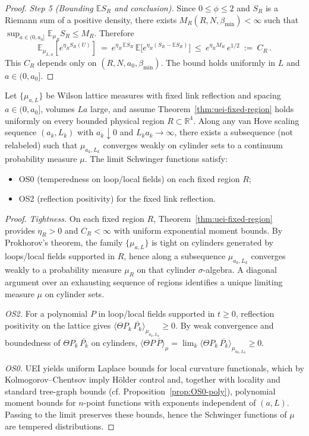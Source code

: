 \documentclass[11pt]{amsart}
\begin{document}
\begin{proof}
\emph{Step 5 (Bounding $\mathbb{E}S_R$ and conclusion).} Since $0\le\phi\le 2$ and $S_R$ is a Riemann sum of a positive density, there exists $M_R(R,N,\beta_{\min})<\infty$ such that $\sup_{a\in(0,a_0]}\mathbb{E}_{\mu_R}S_R\le M_R$. Therefore
\[
  \mathbb{E}_{\mu_{L,a}}\!\left[e^{\eta_R S_R(U)}\right]
  \ =\ e^{\eta_R\,\mathbb{E}S_R}\,\mathbb{E}\big[e^{\eta_R(S_R-\mathbb{E}S_R)}\big]
  \ \le\ e^{\eta_R M_R}\,e^{1/2}
  \ :=\ C_R\,.
\]
This $C_R$ depends only on $(R,N,a_0,\beta_{\min})$. The bound holds uniformly in $L$ and $a\in(0,a_0]$.
\end{proof}

\medskip
\begin{proposition}\label{prop:os0os2-closure}
Let $\{\mu_{a,L}\}$ be Wilson lattice measures with fixed link reflection and spacing $a\in(0,a_0]$, volumes $L a$ large, and assume Theorem~\ref{thm:uei-fixed-region} holds uniformly on every bounded physical region $R\subset\mathbb R^4$. Along any van Hove scaling sequence $(a_k,L_k)$ with $a_k\downarrow 0$ and $L_k a_k\to\infty$, there exists a subsequence (not relabeled) such that $\mu_{a_k,L_k}$ converges weakly on cylinder sets to a continuum probability measure $\mu$. The limit Schwinger functions satisfy:
\begin{itemize}
  \item OS0 (temperedness on loop/local fields) on each fixed region $R$;
  \item OS2 (reflection positivity) for the fixed link reflection.
\end{itemize}
\end{proposition}
\begin{proof}
\emph{Tightness.} On each fixed region $R$, Theorem~\ref{thm:uei-fixed-region} provides $\eta_R>0$ and $C_R<\infty$ with uniform exponential moment bounds. By Prokhorov's theorem, the family $\{\mu_{a,L}\}$ is tight on cylinders generated by loops/local fields supported in $R$, hence along a subsequence $\mu_{a_k,L_k}$ converges weakly to a probability measure $\mu_R$ on that cylinder $\sigma$-algebra. A diagonal argument over an exhausting sequence of regions identifies a unique limiting measure $\mu$ on cylinder sets.

\emph{OS2.} For a polynomial $P$ in loop/local fields supported in $t\ge 0$, reflection positivity on the lattice gives $\langle \Theta P_k\,\overline{P_k}\rangle_{\mu_{a_k,L_k}}\ge 0$. By weak convergence and boundedness of $\Theta P_k\,\overline{P_k}$ on cylinders, $\langle \Theta P\,\overline{P}\rangle_{\mu}=\lim_k \langle \Theta P_k\,\overline{P_k}\rangle_{\mu_{a_k,L_k}}\ge 0$.

\emph{OS0.} UEI yields uniform Laplace bounds for local curvature functionals, which by Kolmogorov--Chentsov imply Hölder control and, together with locality and standard tree-graph bounds (cf. Proposition~\ref{prop:OS0-poly}), polynomial moment bounds for $n$-point functions with exponents independent of $(a,L)$. Passing to the limit preserves these bounds, hence the Schwinger functions of $\mu$ are tempered distributions.
\end{proof}
\end{document}
